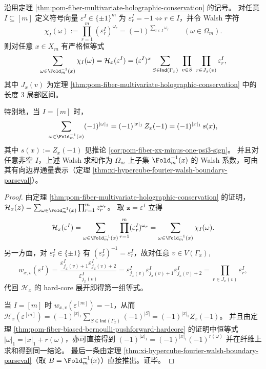 \begin{corollary}\label{cor:pom-fiber-walsh-hardcore-stokes-sign}
沿用定理 \ref{thm:pom-fiber-multivariate-holographic-conservation} 的记号。
对任意 \(I\subseteq[m]\) 定义符号向量 \(\varepsilon^I\in\{\pm1\}^m\) 为
\(
\varepsilon^I_r=-1\iff r\in I
\)，并令 Walsh 字符
\[
\chi_I(\omega):=\prod_{r=1}^{m}(\varepsilon^I_r)^{\omega_r}=(-1)^{\sum_{r\in I}\omega_r}\qquad(\omega\in\Omega_m).
\]
则对任意 \(x\in X_m\) 有严格恒等式
\[
\sum_{\omega\in \Fold_m^{-1}(x)}\chi_I(\omega)=\mathcal H_x(\varepsilon^I)
=(\varepsilon^I)^x\sum_{S\in\mathsf{Ind}(\Gamma_x)}\ \prod_{v\in S}\ \prod_{r\in J_x(v)}\varepsilon^I_r,
\]
其中 \(J_x(v)\) 为定理 \ref{thm:pom-fiber-multivariate-holographic-conservation} 中的长度 \(3\) 局部区间。
\par
特别地，当 \(I=[m]\) 时，
\[
\sum_{\omega\in \Fold_m^{-1}(x)}(-1)^{|\omega|_1}=(-1)^{|x|_1}\,Z_x(-1)=(-1)^{|x|_1}\,s(x),
\]
其中 \(s(x):=Z_x(-1)\) 见推论 \ref{cor:pom-fiber-zx-minus-one-psi3-sign}。
并且对任意非空 \(I\)，上述 Walsh 求和作为 \(\Omega_m\) 上子集 \(\Fold_m^{-1}(x)\) 的 Walsh 系数，可由其有向边界通量表示（定理 \ref{thm:xi-hypercube-fourier-walsh-boundary-parseval}）。
\end{corollary}
\begin{proof}
由定理 \ref{thm:pom-fiber-multivariate-holographic-conservation} 的证明，
\(
\mathcal H_x(\boldsymbol z)=\sum_{\omega\in\Fold_m^{-1}(x)}\prod_{r=1}^m z_r^{\omega_r}
\)。
取 \(\boldsymbol z=\varepsilon^I\) 立得
\[
\mathcal H_x(\varepsilon^I)=\sum_{\omega\in\Fold_m^{-1}(x)}\prod_{r=1}^{m}(\varepsilon^I_r)^{\omega_r}
=\sum_{\omega\in\Fold_m^{-1}(x)}\chi_I(\omega).
\]
另一方面，对 \(\varepsilon^I_r\in\{\pm 1\}\) 有 \((\varepsilon^I_r)^{-1}=\varepsilon^I_r\)，故对任意 \(v\in V(\Gamma_x)\),
\[
w_{x,v}(\varepsilon^I)
=\frac{\varepsilon^I_{j_x(v)+1}\varepsilon^I_{j_x(v)+2}}{\varepsilon^I_{j_x(v)}}
=\varepsilon^I_{j_x(v)}\varepsilon^I_{j_x(v)+1}\varepsilon^I_{j_x(v)+2}
=\prod_{r\in J_x(v)}\varepsilon^I_r,
\]
代回 \(\mathcal H_x\) 的 hard-core 展开即得第一组等式。
\par
当 \(I=[m]\) 时 \(w_{x,v}(\varepsilon^{[m]})=-1\)，从而
\(
\mathcal H_x(\varepsilon^{[m]})=(-1)^{|x|_1}\sum_{S\in\mathsf{Ind}(\Gamma_x)}(-1)^{|S|}
=(-1)^{|x|_1}Z_x(-1)
\)。
并且由定理 \ref{thm:pom-fiber-biased-bernoulli-pushforward-hardcore} 的证明中恒等式 \(|\omega|_1=|x|_1+r(\omega)\)，亦可直接得到
\(
(-1)^{|\omega|_1}=(-1)^{|x|_1}(-1)^{r(\omega)}
\)
并在纤维上求和得到同一结论。
最后一条由定理 \ref{thm:xi-hypercube-fourier-walsh-boundary-parseval}（取 \(B=\Fold_m^{-1}(x)\)）直接推出。证毕。
\end{proof}



\endinput
